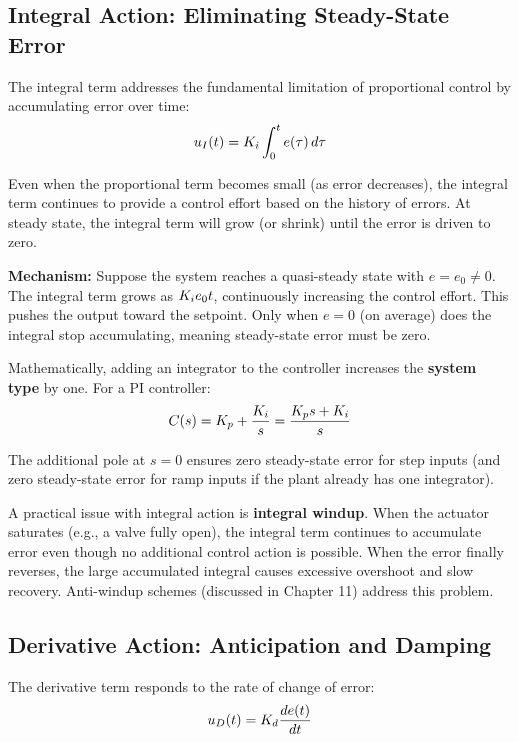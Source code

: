 \subsection{Integral Action: Eliminating Steady-State Error}

The integral term addresses the fundamental limitation of proportional control by accumulating error over time:
\begin{equation}
u_I(t) = K_i \int_0^t e(\tau) \, d\tau
\end{equation}

Even when the proportional term becomes small (as error decreases), the integral term continues to provide a control effort based on the history of errors. At steady state, the integral term will grow (or shrink) until the error is driven to zero.

\textbf{Mechanism:} Suppose the system reaches a quasi-steady state with $e = e_0 \neq 0$. The integral term grows as $K_i e_0 t$, continuously increasing the control effort. This pushes the output toward the setpoint. Only when $e = 0$ (on average) does the integral stop accumulating, meaning steady-state error must be zero.

Mathematically, adding an integrator to the controller increases the \textbf{system type} by one. For a PI controller:
\begin{equation}
C(s) = K_p + \frac{K_i}{s} = \frac{K_p s + K_i}{s}
\end{equation}

The additional pole at $s = 0$ ensures zero steady-state error for step inputs (and zero steady-state error for ramp inputs if the plant already has one integrator).

\begin{remark}
A practical issue with integral action is \textbf{integral windup}. When the actuator saturates (e.g., a valve fully open), the integral term continues to accumulate error even though no additional control action is possible. When the error finally reverses, the large accumulated integral causes excessive overshoot and slow recovery. Anti-windup schemes (discussed in Chapter 11) address this problem.
\end{remark}

\subsection{Derivative Action: Anticipation and Damping}

The derivative term responds to the rate of change of error:
\begin{equation}
u_D(t) = K_d \frac{de(t)}{dt}
\end{equation}

